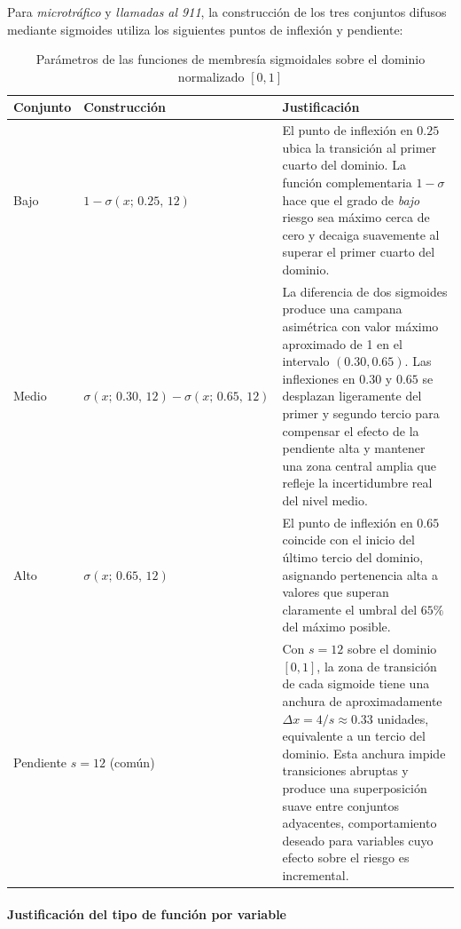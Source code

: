\documentclass[11pt]{article}
\begin{document}
Para \textit{microtráfico} y \textit{llamadas al 911}, la construcción de los tres conjuntos difusos mediante sigmoides utiliza los siguientes puntos de inflexión y pendiente:

\begin{table}[H]
    \centering
    \caption{Parámetros de las funciones de membresía sigmoidales sobre el dominio normalizado $[0,1]$}
    \begin{tabular}{lp{3.5cm}p{7cm}}
        \toprule
        \textbf{Conjunto} & \textbf{Construcción} & \textbf{Justificación} \\
        \midrule
        Bajo  & $1 - \sigma(x;\, 0.25,\, 12)$ & El punto de inflexión en $0.25$ ubica la transición al primer cuarto del dominio. La función complementaria $1 - \sigma$ hace que el grado de \textit{bajo} riesgo sea máximo cerca de cero y decaiga suavemente al superar el primer cuarto del dominio. \\
        Medio & $\sigma(x;\, 0.30,\, 12) - \sigma(x;\, 0.65,\, 12)$ & La diferencia de dos sigmoides produce una campana asimétrica con valor máximo aproximado de 1 en el intervalo $(0.30, 0.65)$. Las inflexiones en $0.30$ y $0.65$ se desplazan ligeramente del primer y segundo tercio para compensar el efecto de la pendiente alta y mantener una zona central amplia que refleje la incertidumbre real del nivel medio. \\
        Alto  & $\sigma(x;\, 0.65,\, 12)$ & El punto de inflexión en $0.65$ coincide con el inicio del último tercio del dominio, asignando pertenencia alta a valores que superan claramente el umbral del $65\%$ del máximo posible. \\
        \midrule
        \multicolumn{2}{l}{Pendiente $s = 12$ (común)} & Con $s = 12$ sobre el dominio $[0,1]$, la zona de transición de cada sigmoide tiene una anchura de aproximadamente $\Delta x = 4/s \approx 0.33$ unidades, equivalente a un tercio del dominio. Esta anchura impide transiciones abruptas y produce una superposición suave entre conjuntos adyacentes, comportamiento deseado para variables cuyo efecto sobre el riesgo es incremental. \\
        \bottomrule
    \end{tabular}
    \label{tab:params-sigmoidal}
    \par{}
\end{table}

\paragraph{Justificación del tipo de función por variable}
\end{document}
